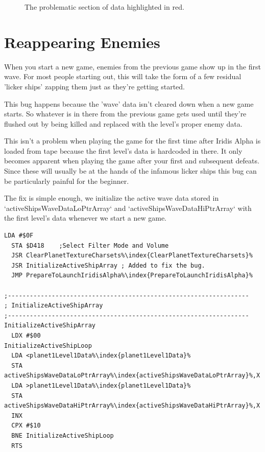 \begin{figure}[H]
  {
    \begin{adjustbox}{width=14cm,center}
    \end{adjustbox}
  }\caption[]{The problematic section of data highlighted in red.}
\end{figure}



\section{Reappearing Enemies}

When you start a new game, enemies from the previous game show up in the first
wave. For most people starting out, this will take the form of a few residual
'licker ships' zapping them just as they're getting started.

This bug happens because the 'wave' data isn't cleared down when a new game
starts. So whatever is in there from the previous game gets used until they're
flushed out by being killed and replaced with the level's proper enemy data.

This isn't a problem when playing the game for the first time after Iridis Alpha is loaded from tape because
the first level's data is hardcoded in there. It only becomes apparent when playing the game after your first and subsequent defeats. Since these will usually be at the hands of the infamous licker ships this bug can be particularly painful for the beginner.

The fix is simple enough, we initialize the active wave data stored in `activeShipsWaveDataLoPtrArray` and `activeShipsWaveDataHiPtrArray`
with the first level's data whenever we start a new game. 

\begin{lstlisting}[caption=Fixing the reappearing enemy bug,escapechar=\%]
  LDA #$0F 
  STA $D418    ;Select Filter Mode and Volume 
  JSR ClearPlanetTextureCharsets%\index{ClearPlanetTextureCharsets}% 
  JSR InitializeActiveShipArray ; Added to fix the bug.
  JMP PrepareToLaunchIridisAlpha%\index{PrepareToLaunchIridisAlpha}% 

;------------------------------------------------------------------ 
; InitializeActiveShipArray 
;------------------------------------------------------------------ 
InitializeActiveShipArray 
  LDX #$00 
InitializeActiveShipLoop 
  LDA <planet1Level1Data%\index{planet1Level1Data}% 
  STA activeShipsWaveDataLoPtrArray%\index{activeShipsWaveDataLoPtrArray}%,X 
  LDA >planet1Level1Data%\index{planet1Level1Data}% 
  STA activeShipsWaveDataHiPtrArray%\index{activeShipsWaveDataHiPtrArray}%,X 
  INX 
  CPX #$10 
  BNE InitializeActiveShipLoop 
  RTS 
\end{lstlisting}

